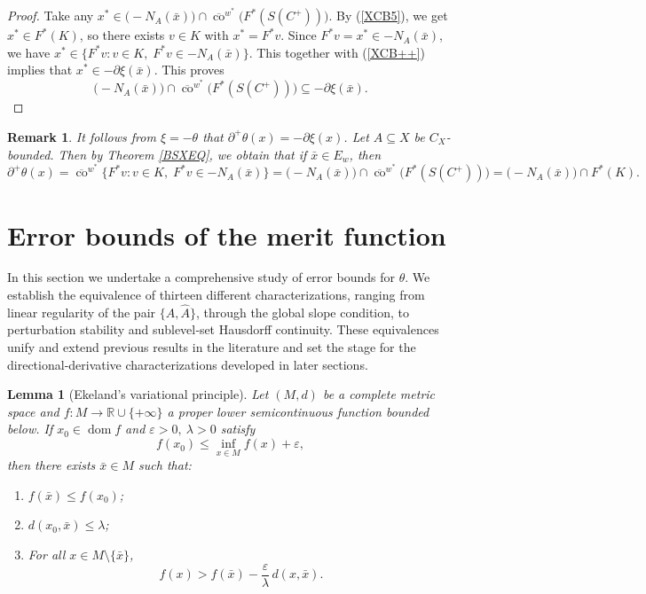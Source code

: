\documentclass[11pt]{article}
\newtheorem{lemma}{Lemma}[section]
\newtheorem{remark}{Remark}[section]
\begin{document}
\begin{proof}
 
	Take any $x^* \in \bigl( -N_A(\bar{x}) \bigr) \cap \overline{\operatorname{co}}^{w^*} \bigl( F^*(S(C^+)) \bigr)$.
	By (\ref{XCB5}), we get  $x^* \in F^*(K)$, so there exists $v \in K$ with $x^* = F^*v$.
	Since $F^*v  =    x^* \in -N_A(\bar{x})$,     we have $x^* \in \bigl\{ F^*v : v \in K,\; F^*v \in -N_A(\bar{x}) \bigr\}$.   This together with  (\ref{XCB++})  implies that  $x^* \in   -\partial \xi(\bar{x}).$
	 	This proves
	\[
	\bigl( -N_A(\bar{x}) \bigr) \cap \overline{\operatorname{co}}^{w^*} \bigl( F^*(S(C^+)) \bigr) \subseteq -\partial \xi(\bar{x}).
	\]
\end{proof}

\begin{remark}  \label{RXExcQ}  
	It follows from   $\xi = -\theta$  that  $	\partial^+ \theta(x) =  	- \partial \xi({x}) $.   Let $A  \subseteq X$ be $C_X$-bounded.    Then by Theorem \ref{BSXEQ}, we obtain that if $\bar{x} \in E_w$, then 
		\[
		\partial^+ \theta(x) = \overline{\operatorname{co}}^{w^*} \bigl\{ F^*v : v \in K,\; F^*v \in -N_A(\bar{x}) \bigr\} = \bigl( -N_A(\bar{x}) \bigr) \cap \overline{\operatorname{co}}^{w^*} \bigl( F^*(S(C^+)) \bigr) = \bigl( -N_A(\bar{x}) \bigr) \cap F^*(K).
	\]
	
	
	
  \end{remark}



\section{Error bounds   of the merit   function  }\label{sec:errorbounds}

 In this section we undertake a comprehensive study of error bounds for \(\theta\). We establish the equivalence of thirteen different characterizations, ranging from linear regularity of the pair \(\{A,\widehat A\}\), through  the  global slope condition, to perturbation stability and sublevel‐set Hausdorff continuity. These equivalences unify and extend previous results in the literature and set the stage for the directional‐derivative characterizations developed in later sections.  

\begin{lemma}[Ekeland's variational principle]\label{ELdaz}
	Let $(M, d)$ be a complete metric space and $f: M \to \mathbb{R} \cup \{+\infty\}$ a proper lower semicontinuous function bounded below. If $x_0 \in \operatorname{dom} f$ and $\varepsilon > 0,\ \lambda > 0$ satisfy
	\[
	f(x_0) \le \inf_{x \in M} f(x) + \varepsilon,
	\]
	then there exists $\bar{x} \in M$ such that:
	\begin{enumerate}
		\item $f(\bar{x}) \le f(x_0)$;
		\item $d(x_0, \bar{x}) \le \lambda$;
		\item For all $x \in M \setminus \{\bar{x}\}$,
		\[
		f(x) > f(\bar{x}) - \frac{\varepsilon}{\lambda} \, d(x, \bar{x}) .
		\]
	\end{enumerate}
\end{lemma}
\end{document}
